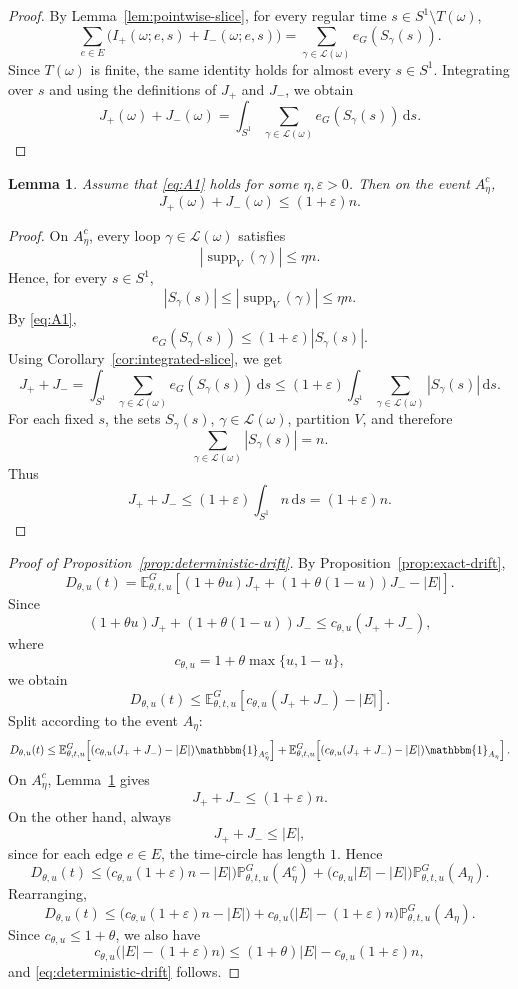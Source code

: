 \documentclass[11pt]{article}
\newtheorem{lemma}[theorem]{Lemma}
\theoremstyle{remark}
\theoremstyle{plain}
\newcommand{\Pbb}{\mathbb{P}}
\newcommand{\Ebb}{\mathbb{E}}
\newcommand{\1}{\mathbbm{1}}
\newcommand{\dd}{\mathrm{d}}
\newcommand{\cL}{\mathcal{L}}
\begin{document}
\begin{proof}
By Lemma~\ref{lem:pointwise-slice}, for every regular time
\(s\in S^1\setminus T(\omega)\),
\[
\sum_{e\in E}\bigl(I_+(\omega;e,s)+I_-(\omega;e,s)\bigr)
=
\sum_{\gamma\in\cL(\omega)} e_G(S_\gamma(s)).
\]
Since \(T(\omega)\) is finite, the same identity holds for almost every \(s\in S^1\).
Integrating over \(s\) and using the definitions of \(J_+\) and \(J_-\), we obtain
\[
J_+(\omega)+J_-(\omega)
=
\int_{S^1}\sum_{\gamma\in\cL(\omega)} e_G(S_\gamma(s))\,\dd s.
\]
\end{proof}

\begin{lemma}
\label{lem:slice}
Assume that \eqref{eq:A1} holds for some \(\eta,\varepsilon>0\). Then on the event
\(A_\eta^c\),
\[
J_+(\omega)+J_-(\omega)\le (1+\varepsilon)n.
\]
\end{lemma}

\begin{proof}
On \(A_\eta^c\), every loop \(\gamma\in\cL(\omega)\) satisfies
\[
|\operatorname{supp}_V(\gamma)|\le \eta n.
\]
Hence, for every \(s\in S^1\),
\[
|S_\gamma(s)|\le |\operatorname{supp}_V(\gamma)|\le \eta n.
\]
By \eqref{eq:A1},
\[
e_G(S_\gamma(s))\le (1+\varepsilon)|S_\gamma(s)|.
\]
Using Corollary~\ref{cor:integrated-slice}, we get
\[
J_+ + J_-
=
\int_{S^1}\sum_{\gamma\in\cL(\omega)} e_G(S_\gamma(s))\,\dd s
\le
(1+\varepsilon)\int_{S^1}\sum_{\gamma\in\cL(\omega)} |S_\gamma(s)|\,\dd s.
\]
For each fixed \(s\), the sets \(S_\gamma(s)\), \(\gamma\in\cL(\omega)\), partition \(V\),
and therefore
\[
\sum_{\gamma\in\cL(\omega)} |S_\gamma(s)|=n.
\]
Thus
\[
J_+ + J_-
\le
(1+\varepsilon)\int_{S^1} n\,\dd s
=
(1+\varepsilon)n.
\]
\end{proof}

\begin{proof}[Proof of Proposition~\ref{prop:deterministic-drift}]
By Proposition~\ref{prop:exact-drift},
\[
D_{\theta,u}(t)
=
\Ebb_{\theta,t,u}^G\!\left[
(1+\theta u)J_+ + (1+\theta(1-u))J_- - |E|
\right].
\]
Since
\[
(1+\theta u)J_+ + (1+\theta(1-u))J_-
\le
c_{\theta,u}(J_+ + J_-),
\]
where
\[
c_{\theta,u}=1+\theta\max\{u,1-u\},
\]
we obtain
\[
D_{\theta,u}(t)
\le
\Ebb_{\theta,t,u}^G\!\left[c_{\theta,u}(J_+ + J_-) - |E|\right].
\]
Split according to the event \(A_\eta\):
\[
D_{\theta,u}(t)
\le
\Ebb_{\theta,t,u}^G\!\left[(c_{\theta,u}(J_+ + J_-) - |E|)\1_{A_\eta^c}\right]
+
\Ebb_{\theta,t,u}^G\!\left[(c_{\theta,u}(J_+ + J_-) - |E|)\1_{A_\eta}\right].
\]
On \(A_\eta^c\), Lemma~\ref{lem:slice} gives
\[
J_+ + J_- \le (1+\varepsilon)n.
\]
On the other hand, always
\[
J_+ + J_- \le |E|,
\]
since for each edge \(e\in E\), the time-circle has length \(1\). Hence
\[
D_{\theta,u}(t)
\le
\bigl(c_{\theta,u}(1+\varepsilon)n-|E|\bigr)\Pbb_{\theta,t,u}^G(A_\eta^c)
+
\bigl(c_{\theta,u}|E|-|E|\bigr)\Pbb_{\theta,t,u}^G(A_\eta).
\]
Rearranging,
\[
D_{\theta,u}(t)
\le
\bigl(c_{\theta,u}(1+\varepsilon)n-|E|\bigr)
+
c_{\theta,u}\bigl(|E|-(1+\varepsilon)n\bigr)\Pbb_{\theta,t,u}^G(A_\eta).
\]
Since \(c_{\theta,u}\le 1+\theta\), we also have
\[
c_{\theta,u}\bigl(|E|-(1+\varepsilon)n\bigr)
\le
(1+\theta)|E|-c_{\theta,u}(1+\varepsilon)n,
\]
and \eqref{eq:deterministic-drift} follows.
\end{proof}
\end{document}

